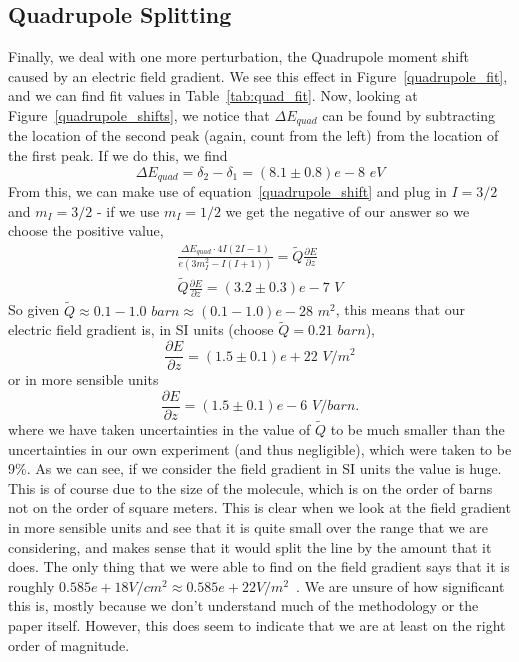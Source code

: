 \documentclass[reprint, nobibnotes, amssymb, amsmath, amsfonts, mathtools, mathrsfs, floatfix]{revtex4-1}
\begin{document}
    \subsection{Quadrupole Splitting}
      Finally, we deal with one more perturbation, the Quadrupole moment shift caused by an electric field gradient.  We see this effect in Figure~\ref{quadrupole_fit}, and we can find fit values in Table~\ref{tab:quad_fit}.  Now, looking at Figure~\ref{quadrupole_shifts}, we notice that $\Delta E_{quad}$ can be found by subtracting the location of the second peak (again, count from the left) from the location of the first peak.  If we do this, we find
      \begin{equation}
        \Delta E_{quad} = \delta_2 - \delta_1 = (8.1 \pm 0.8)e-8 \,\, eV
      \end{equation}
      From this, we can make use of equation~\ref{quadrupole_shift} and plug in $I = 3/2$ and $m_I = 3/2$ - if we use $m_I = 1/2$ we get the negative of our answer so we choose the positive value,
      \begin{gather}
        \frac{\Delta E_{quad} \cdot 4I(2I-1)}{e\left(3 m_I^2 - I(I+1)\right)} = \tilde{Q}\frac{\partial E}{\partial z} \\
        \tilde{Q}\frac{\partial E}{\partial z} = (3.2\pm0.3)e-7 \,\, V
      \end{gather}
      So given $\tilde{Q} \approx 0.1-1.0 \,\, barn \approx (0.1-1.0)e-28 \,\, m^{2}$, this means that our electric field gradient is, in SI units (choose $\tilde{Q} = 0.21\,\, barn$\cite{field_gradient}),
      \begin{equation}
        \frac{\partial E}{\partial z} = (1.5\pm0.1)e+22 \,\, V/m^2
      \end{equation}
      or in more sensible units
      \begin{equation}
        \frac{\partial E}{\partial z} = (1.5\pm0.1)e-6\,\, V/barn.
      \end{equation}
      where we have taken uncertainties in the value of $\tilde{Q}$ to be much smaller than the uncertainties in our own experiment (and thus negligible), which were taken to be 9\%.  As we can see, if we consider the field gradient in SI units the value is huge.  This is of course due to the size of the molecule, which is on the order of barns not on the order of square meters.  This is clear when we look at the field gradient in more sensible units and see that it is quite small over the range that we are considering, and makes sense that it would split the line by the amount that it does.  The only thing that we were able to find on the field gradient says that it is roughly $0.585e+18 V/cm^2 \approx 0.585e+22 V/m^2$~\cite{na_nitroprusside}.  We are unsure of how significant this is, mostly because we don't understand much of the methodology or the paper itself.  However, this does seem to indicate that we are at least on the right order of magnitude.
\end{document}
